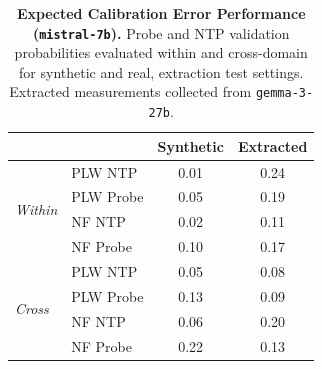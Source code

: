 \begin{table}[ht]
\centering
\begin{tabular}{ll cc}
\toprule
& & Synthetic & Extracted \\
\midrule
\multirow{4}{*}{\textit{Within}}
& PLW NTP & 0.01 & 0.24 \\
& PLW Probe & 0.05 & 0.19 \\
& NF NTP & 0.02 & 0.11 \\
& NF Probe & 0.10 & 0.17 \\
\midrule
\multirow{4}{*}{\textit{Cross}}
& PLW NTP & 0.05 & 0.08 \\
& PLW Probe & 0.13 & 0.09 \\
& NF NTP & 0.06 & 0.20 \\
& NF Probe & 0.22 & 0.13 \\
\bottomrule
\end{tabular}
\caption{\textbf{Expected Calibration Error Performance (\texttt{mistral-7b}).} Probe and NTP validation probabilities evaluated within and cross-domain for synthetic and real, extraction test settings. Extracted measurements collected from \texttt{gemma-3-27b}.}
\label{tab:mistral-7b-gemma-3-27b}
\end{table}
